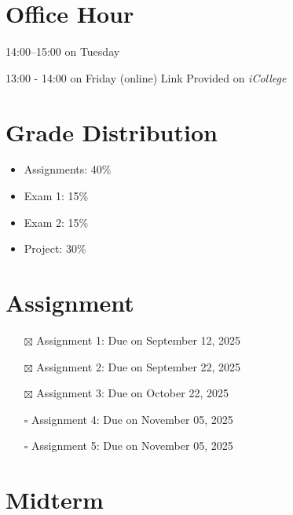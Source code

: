 \documentclass[
  letterpaper,
  DIV=11,
  numbers=noendperiod]{scrreprt}
\providecommand{\tightlist}{%
  \setlength{\itemsep}{0pt}\setlength{\parskip}{0pt}}
\begin{document}
\section*{Office Hour}\label{office-hour}


14:00--15:00 on Tuesday

13:00 - 14:00 on Friday (online) Link Provided on \emph{iCollege}

\section*{Grade Distribution}\label{grade-distribution}


\begin{itemize}
\tightlist
\item
  Assignments: 40\%
\item
  Exam 1: 15\%
\item
  Exam 2: 15\%
\item
  Project: 30\%
\end{itemize}

\section*{Assignment}\label{assignment}


\begin{itemize}
\tightlist
\item[$\boxtimes$]
  Assignment 1: Due on September 12, 2025
\item[$\boxtimes$]
  Assignment 2: Due on September 22, 2025
\item[$\boxtimes$]
  Assignment 3: Due on October 22, 2025
\item[$\square$]
  Assignment 4: Due on November 05, 2025
\item[$\square$]
  Assignment 5: Due on November 05, 2025
\end{itemize}

\section*{Midterm}\label{midterm}

\end{document}

